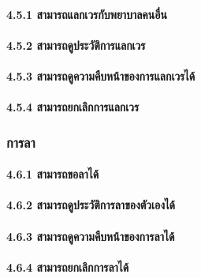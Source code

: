 \hspace{2.5cm}\paragraph{4.5.1 สามารถแลกเวรกับพยาบาลคนอื่น}

\hspace{2.5cm}\paragraph{4.5.2 สามารถดูประวัติการแลกเวร}

\hspace{2.5cm}\paragraph{4.5.3 สามารถดูความคืบหน้าของการแลกเวรได้}

\hspace{2.5cm}\paragraph{4.5.4 สามารถยกเลิกการแลกเวร}


\hspace{1cm}\subsubsection{การลา}

\hspace{2.5cm}\paragraph{4.6.1 สามารถขอลาได้}

\hspace{2.5cm}\paragraph{4.6.2 สามารถดูประวัติการลาของตัวเองได้}

\hspace{2.5cm}\paragraph{4.6.3 สามารถดูความคืบหน้าของการลาได้}

\hspace{2.5cm}\paragraph{4.6.4 สามารถยกเลิกการลาได้}



